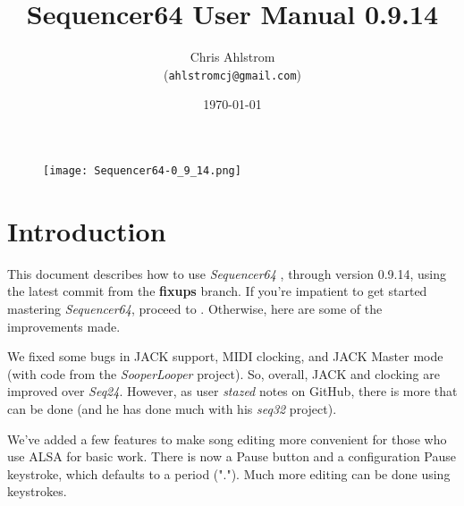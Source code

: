 \documentclass[
 11pt,
 twoside,
 a4paper,
 headinclude,
 footinclude,
 final                                 %
]{article}
\begin{document}
\title{Sequencer64 User Manual 0.9.14}
\author{Chris Ahlstrom \\
   (\texttt{ahlstromcj@gmail.com})}
\date{\today}
\maketitle

\begin{figure}[H]
   \centering 
   \texttt{[image: Sequencer64-0\_9\_14.png]}
\end{figure}

\clearpage                             %

\tableofcontents
\listoffigures                         %
\listoftables                          %


\setlength{\parindent}{0pt}
\setlength{\parskip}{1ex plus 0.5ex minus 0.2ex}

\section{Introduction}
\label{sec:introduction}

   This document describes how to use \textsl{Sequencer64}
   \cite{sequencer64}, through version 0.9.14,
   using the latest commit from the \textbf{fixups} branch.
   If you're impatient to get started mastering \textsl{Sequencer64},
   proceed to .
   Otherwise, here are some of the improvements made.

   We fixed some bugs in JACK support, MIDI clocking, and
   JACK Master mode (with code from the \textsl{SooperLooper} project).
   So, overall, JACK and clocking are improved over \textsl{Seq24}.
   However, as user \textsl{stazed} notes on GitHub, there is more that can be
   done (and he has done much with his \textsl{seq32} \cite{seq32} project).

   We've added a few features to make song editing more
   convenient for those who use ALSA for basic work.
   There is now a Pause button and a configuration Pause
   keystroke, which defaults to a period (".").
   Much more editing can be done using keystrokes.
\end{document}
